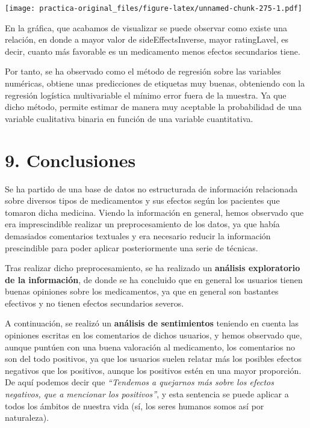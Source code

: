 \documentclass[spanish,]{article}
\begin{document}
\texttt{[image: practica-original\_files/figure-latex/unnamed-chunk-275-1.pdf]}

En la gráfica, que acabamos de visualizar se puede observar como existe
una relación, en donde a mayor valor de sideEffectsInverse, mayor
ratingLavel, es decir, cuanto más favorable es un medicamento menos
efectos secundarios tiene.

Por tanto, se ha observado como el método de regresión sobre las
variables numéricas, obtiene unas predicciones de etiquetas muy buenas,
obteniendo con la regresión logística multivariable el mínimo error
fuera de la muestra. Ya que dicho método, permite estimar de manera muy
aceptable la probabilidad de una variable cualitativa binaria en función
de una variable cuantitativa.

\newpage

\section{9. Conclusiones}\label{conclusiones}

Se ha partido de una base de datos no estructurada de información
relacionada sobre diversos tipos de medicamentos y sus efectos según los
pacientes que tomaron dicha medicina. Viendo la información en general,
hemos observado que era imprescindible realizar un preprocesamiento de
los datos, ya que había demasiados comentarios textuales y era necesario
reducir la información prescindible para poder aplicar posteriormente
una serie de técnicas.

Tras realizar dicho preprocesamiento, se ha realizado un
\textbf{análisis exploratorio de la información}, de donde se ha
concluido que en general los usuarios tienen buenas opiniones sobre los
medicamentos, ya que en general son bastantes efectivos y no tienen
efectos secundarios severos.

A continuación, se realizó un \textbf{análisis de sentimientos} teniendo
en cuenta las opiniones escritas en los comentarios de dichos usuarios,
y hemos observado que, aunque puntúen con una buena valoración al
medicamento, los comentarios no son del todo positivos, ya que los
usuarios suelen relatar más los posibles efectos negativos que los
positivos, aunque los positivos estén en una mayor proporción. De aquí
podemos decir que \emph{``Tendemos a quejarnos más sobre los efectos
negativos, que a mencionar los positivos''}, y esta sentencia se puede
aplicar a todos los ámbitos de nuestra vida (sí, los seres humanos somos
así por naturaleza).
\end{document}
